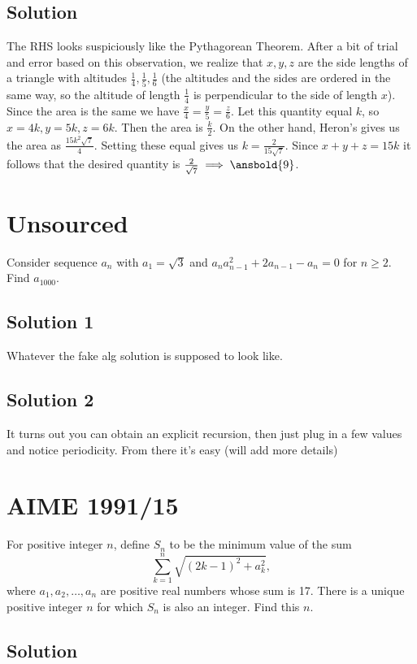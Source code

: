 \documentclass{article}
\begin{document}
\subsection{Solution}
The RHS looks suspiciously like the Pythagorean Theorem. After a bit of trial and error based on this observation, we realize that $x,y,z$ are the side lengths of a triangle with altitudes $\frac{1}{4},\frac{1}{5},\frac{1}{6}$ (the altitudes and the sides are ordered in the same way, so the altitude of length $\frac{1}{4}$ is perpendicular to the side of length $x$). Since the area is the same we have $\frac{x}{4}=\frac{y}{5}=\frac{z}{6}$. Let this quantity equal $k$, so $x=4k,y=5k,z=6k$. Then the area is $\frac{k}{2}$. On the other hand, Heron's gives us the area as $\frac{15k^2\sqrt{7}}{4}$. Setting these equal gives us $k=\frac{2}{15\sqrt{7}}$. Since $x+y+z=15k$ it follows that the desired quantity is $\frac{2}{\sqrt{7}} \implies \ansbold{9}$.

\pagebreak\section{Unsourced}
Consider sequence $a_n$ with $a_1=\sqrt{3}$ and $a_na_{n-1}^2+2a_{n-1}-a_n=0$ for $n\geq 2.$ Find $a_{1000}.$

\subsection{Solution 1}
Whatever the fake alg solution is supposed to look like.

\subsection{Solution 2}
It turns out you can obtain an explicit recursion, then just plug in a few values and notice periodicity. From there it's easy (will add more details)

\pagebreak\section{AIME 1991/15}
For positive integer $n$, define $S_n$ to be the minimum value of the sum\[ \sum_{k=1}^n \sqrt{(2k-1)^2+a_k^2}, \]where $a_1,a_2,\ldots,a_n$ are positive real numbers whose sum is 17. There is a unique positive integer $n$ for which $S_n$ is also an integer. Find this $n$.

\subsection{Solution}
\end{document}
